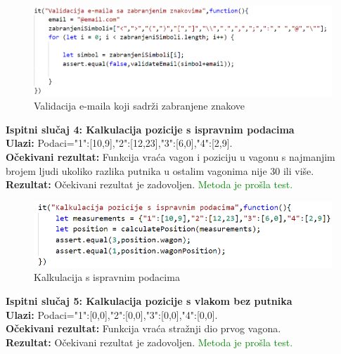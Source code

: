 {			%
				\begin{figure}[H]
					\centering
					\includegraphics[width=1\linewidth]{"slike/validacijaSaZabranjenimZnakovima.png"}
					\caption{Validacija e-maila koji sadrži zabranjene znakove}
					\label{fig:zab-val}
				\end{figure}

			
			\noindent \textbf {Ispitni slučaj 4: Kalkulacija pozicije s ispravnim podacima}\\
			\noindent \textbf {Ulazi:} Podaci={"1":[10,9],"2":[12,23],"3":[6,0],"4":[2,9]}.\\
			\noindent \textbf {Očekivani rezultat:} Funkcija vraća vagon i poziciju u vagonu s najmanjim brojem ljudi ukoliko razlika putnika u ostalim vagonima nije 30 ili više.\\
			\noindent \textbf {Rezultat:} Očekivani rezultat je zadovoljen. \textcolor{green}{Metoda je prošla test.}\\

				\begin{figure}[H]
					\centering
					\includegraphics[width=1\linewidth]{"slike/kalkulacija1.png"}
					\caption{Kalkulacija s ispravnim podacima}
					\label{fig:isp-kal}
				\end{figure}

			\noindent \textbf {Ispitni slučaj 5: Kalkulacija pozicije s vlakom bez putnika }\\
			\noindent \textbf {Ulazi:} Podaci={"1":[0,0],"2":[0,0],"3":[0,0],"4":[0,0]}.\\
			\noindent \textbf {Očekivani rezultat:} Funkcija vraća stražnji dio prvog vagona.\\
			\noindent \textbf {Rezultat:} Očekivani rezultat je zadovoljen. \textcolor{green}{Metoda je prošla test.}\\

}
